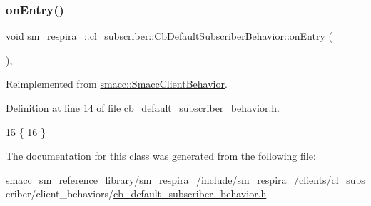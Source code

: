 \subsubsection{\texorpdfstring{on\+Entry()}{onEntry()}}
{\footnotesize\ttfamily void sm\+\_\+respira\+\_\+::cl\+\_\+subscriber\+::\+Cb\+Default\+Subscriber\+Behavior\+::on\+Entry (\begin{DoxyParamCaption}{ }\end{DoxyParamCaption})\hspace{0.3cm}{\ttfamily [inline]}, {\ttfamily [virtual]}}



Reimplemented from \hyperlink{classsmacc_1_1SmaccClientBehavior_a7962382f93987c720ad432fef55b123f}{smacc\+::\+Smacc\+Client\+Behavior}.



Definition at line 14 of file cb\+\_\+default\+\_\+subscriber\+\_\+behavior.\+h.


\begin{DoxyCode}
15     \{
16     \}
\end{DoxyCode}


The documentation for this class was generated from the following file\+:\begin{DoxyCompactItemize}
\item 
smacc\+\_\+sm\+\_\+reference\+\_\+library/sm\+\_\+respira\+\_/include/sm\+\_\+respira\+\_/clients/cl\+\_\+subscriber/client\+\_\+behaviors/\hyperlink{sm__respira__1_2include_2sm__respira__1_2clients_2cl__subscriber_2client__behaviors_2cb__default__subscriber__behavior_8h}{cb\+\_\+default\+\_\+subscriber\+\_\+behavior.\+h}\end{DoxyCompactItemize}
